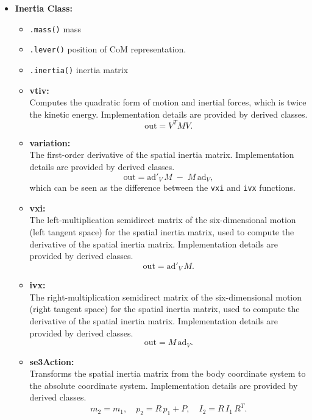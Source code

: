 \documentclass[10pt]{article}
\begin{document}
\begin{itemize}
    \item \textbf{Inertia Class:}
    \begin{itemize}
        \item \texttt{.mass()} mass 
        \item \texttt{.lever()} position of CoM representation.
        \item \texttt{.inertia()} inertia matrix


        \item \textbf{vtiv:}\\
        Computes the quadratic form of motion and inertial forces, which is twice the 
        kinetic energy. Implementation details are provided by derived classes.
        \[
            \text{out} = V^{T} M V.
        \]
        
        \item \textbf{variation:}\\
        The first-order derivative of the spatial inertia matrix. Implementation 
        details are provided by derived classes.
        \[
            \text{out} = \mathrm{ad}'_{V} \, M \;-\; M\,\mathrm{ad}_{V},
        \]
        which can be seen as the difference between the \texttt{vxi} and \texttt{ivx} 
        functions.
        
        \item \textbf{vxi:}\\
        The left-multiplication semidirect matrix of the six-dimensional motion 
        (left tangent space) for the spatial inertia matrix, used to compute the 
        derivative of the spatial inertia matrix. Implementation details are 
        provided by derived classes.
        \[
            \text{out} = \mathrm{ad}'_{V}\,M.
        \]
        
        \item \textbf{ivx:}\\
        The right-multiplication semidirect matrix of the six-dimensional motion 
        (right tangent space) for the spatial inertia matrix, used to compute the 
        derivative of the spatial inertia matrix. Implementation details are 
        provided by derived classes.
        \[
            \text{out} = M\,\mathrm{ad}_{V}.
        \]
        
        \item \textbf{se3Action:}\\
        Transforms the spatial inertia matrix from the body coordinate system to 
        the absolute coordinate system. Implementation details are provided by 
        derived classes.
        \[
            m_{2} = m_{1}, 
            \quad p_{2} = R\,p_{1} + P, 
            \quad I_{2} = R\,I_{1}\,R^{T}.
        \]
        
        \end{itemize}
            
\end{itemize}
\end{document}
